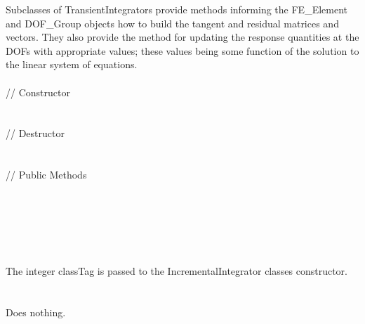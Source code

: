 Subclasses of TransientIntegrators provide
methods informing the FE\_Element and DOF\_Group objects how to build
the tangent and residual matrices and vectors. They also provide the
method for updating the response quantities at the DOFs with
appropriate values; these values being some function of the solution
to the linear system of equations. \\ 


 \\
\indent // Constructor \\
\\  \\
\indent // Destructor  \\ 
\\  \\
\indent // Public Methods \\
 \\
 \\
 \\
 \\

 \\
\\ 
The integer \p classTag is passed to the IncrementalIntegrator
classes constructor. \\

 \\
\\ 
Does nothing. \\

